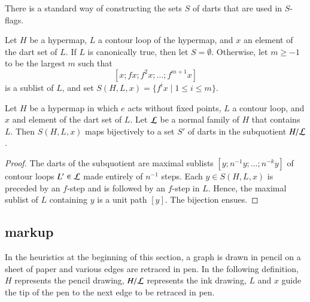 There is a standard way of constructing the sets $S$ of darts that
 are used in $S$-flags.  


\begin{definition}[S]
Let $H$ be a hypermap, $L$ a contour loop of the hypermap,
and $x$ an element of the dart set of $L$.
If  $L$ is  canonically true, then let $S=\emptyset$.
Otherwise,
let $m\ge-1$ to be the largest $m$ 
such that 
\[ 
[x;f x; f^2 x;\ldots;f^{m+1} x]
\]   
is a sublist of $L$, and
set $S(H,L,x) = \{f^i x \mid 1 \le i\le m\}$.
\end{definition}
%

\begin{lemma}\label{lemma:flag-set-subquotient}
Let $H$ be a hypermap in which $e$ acts without fixed points, 
$L$ a contour loop, and $x$ and element of the dart set of $L$.
Let ${\cal L}$ be a normal family of $H$ that contains $L$.
Then $S(H,L,x)$ maps bijectively to a set $S'$ of darts in the subquotient $H/{\cal L}$.
\end{lemma}

\begin{proof} The darts of the subquotient are maximal sublists
  $[y;n^{-1} y;\ldots;n^{-k} y]$ of contour loops $L'\in {\cal L}$
  made entirely of $n^{-1}$ steps.  Each $y\in S(H,L,x)$ is preceded
  by an $f$-step and is followed by an $f$-step in $L$.  Hence, the
  maximal sublist of $L$ containing $y$ is a unit path $[y]$.  The
  bijection ensues.
\end{proof}


\subsection{markup}\label{sec:face-insert}
%




In the heuristics at the beginning of this section, a graph is drawn in pencil
on a sheet of paper and various edges are retraced in pen.  In the following
definition, $H$ represents the pencil drawing, $H/{\cal L}$ represents the ink
drawing,  $L$ and $x$ guide the tip of the pen to the next edge to be retraced in pen.


